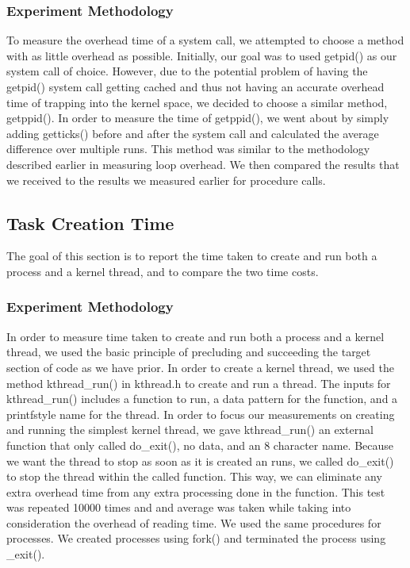\documentclass{article} %
\begin{document}
\subsubsection{Experiment Methodology}
To measure the overhead time of a system call, we attempted to choose a method with as little overhead as possible. Initially, our goal was to used getpid() as our system call of choice. However, due to the potential problem of having the getpid() system call getting cached and thus not having an accurate overhead time of trapping into the kernel space, we decided to choose a similar method, getppid(). In order to measure the time of getppid(), we went about by simply adding getticks() before and after the system call and calculated the average difference over multiple runs. This method was similar to the methodology described earlier in measuring loop overhead. We then compared the results that we received to the results we measured earlier for procedure calls.

\subsection{Task Creation Time}
The goal of this section is to report the time taken to create and run both a process and a kernel thread, and to compare the two time costs.  

\subsubsection{Experiment Methodology}
In order to measure time taken to create and run both a process and a kernel thread, we used the basic principle of precluding and succeeding the target section of code as we have prior. In order to create a kernel thread, we used the method kthread\_run() in kthread.h to create and run a thread. The inputs for kthread\_run() includes a function to run, a data pattern for the function, and a printf\-style name for the thread. In order to focus our measurements on creating and running the simplest kernel thread, we gave kthread\_run() an external function that only called do\_exit(), no data, and an 8 character name. Because we want the thread to stop as soon as it is created an runs, we called do\_exit() to stop the thread within the called function. This way, we can eliminate any extra overhead time from any extra processing done in the function. This test was repeated 10000 times and and average was taken while taking into consideration the overhead of reading time. We used the same procedures for processes. We created processes using fork() and terminated the process using \_exit().
\end{document}
